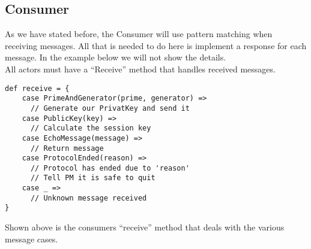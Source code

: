 \subsection{Consumer}
As we have stated before, the Consumer will use pattern matching when receiving messages. All that is needed to do here is implement a response for each message. In the example below we will not show the details. 
\\
All actors must have a ``Receive'' method that handles received messages. 
\begin{lstlisting}
def receive = {
    case PrimeAndGenerator(prime, generator) =>
      // Generate our PrivatKey and send it
    case PublicKey(key) =>
      // Calculate the session key
    case EchoMessage(message) =>
      // Return message
    case ProtocolEnded(reason) =>
      // Protocol has ended due to 'reason'
      // Tell PM it is safe to quit
    case _ =>
      // Unknown message received
}
\end{lstlisting}
Shown above is the consumers ``receive'' method that deals with the various message cases.



















